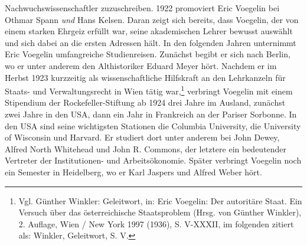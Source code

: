 \documentclass[12pt,a4paper,ngerman]{article}
\begin{document}
Nachwuchswissenschaftler zuzuschreiben. 1922 promoviert Eric Voegelin bei
Othmar Spann {\em und} Hans Kelsen. Daran zeigt sich bereits, dass Voegelin,
der von einem starken Ehrgeiz erfüllt war, seine akademischen Lehrer bewusst
auswählt und sich dabei an die ersten Adressen hält. In den folgenden Jahren
unternimmt Eric Voegelin umfangreiche Studienreisen. Zunächst begibt er sich
nach Berlin, wo er unter anderem den Althistoriker Eduard Meyer hört. Nachdem
er im Herbst 1923 kurzzeitig als wissenschaftliche Hilfskraft an den
Lehrkanzeln für Staats- und Verwaltungsrecht in Wien tätig war,\footnote{Vgl.
  Günther Winkler: Geleitwort, in: Eric Voegelin: Der autoritäre Staat. Ein
  Versuch über das österreichische Staatsproblem (Hrsg.  von Günther Winkler),
  2.  Auflage, Wien / New York 1997 (1936), S. V-XXXII, im folgenden zitiert
  als: Winkler, Geleitwort, S. V.} verbringt Voegelin mit einem Stipendium der
Rockefeller-Stiftung ab 1924 drei Jahre im Ausland, zunächst zwei Jahre in den
USA, dann ein Jahr in Frankreich an der Pariser Sorbonne.  In den USA sind
seine wichtigsten Stationen die Columbia University, die University of
Wisconsin und Harvard. Er studiert dort unter anderem bei John Dewey, Alfred
North Whitehead und John R. Commons, der letztere ein bedeutender Vertreter
der Institutionen- und Arbeitsökonomie.  Später verbringt Voegelin noch ein
Semester in Heidelberg, wo er Karl Jaspers und Alfred Weber hört.
\end{document}
